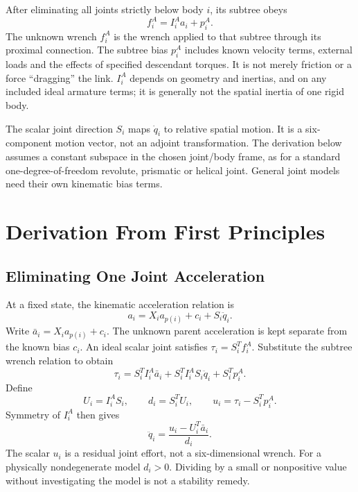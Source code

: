 After eliminating all joints strictly below body $i$, its subtree obeys
\begin{equation}
 f_i^A=I_i^A a_i+p_i^A.
 \label{eq:articulated_inertia}
\end{equation}
The unknown wrench $f_i^A$ is the wrench applied to that subtree through its proximal connection. The subtree bias $p_i^A$ includes known velocity terms, external loads and the effects of specified descendant torques. It is not merely friction or a force ``dragging'' the link. $I_i^A$ depends on geometry and inertias, and on any included ideal armature terms; it is generally not the spatial inertia of one rigid body.

The scalar joint direction $S_i$ maps $\dot q_i$ to relative spatial motion. It is a six-component motion vector, not an adjoint transformation. The derivation below assumes a constant subspace in the chosen joint/body frame, as for a standard one-degree-of-freedom revolute, prismatic or helical joint. General joint models need their own kinematic bias terms.

\section{Derivation From First Principles}
\label{sec:aba_derivation}

\subsection{Eliminating One Joint Acceleration}
\label{subsec:constraint_derivation}

At a fixed state, the kinematic acceleration relation is
\begin{equation}
 a_i=X_i a_{p(i)}+c_i+S_i\ddot q_i.
\end{equation}
Write $\bar a_i=X_i a_{p(i)}+c_i$. The unknown parent acceleration is kept separate from the known bias $c_i$. An ideal scalar joint satisfies $\tau_i=S_i^T f_i^A$. Substitute the subtree wrench relation to obtain
\begin{equation}
 \tau_i=S_i^T I_i^A\bar a_i+S_i^T I_i^A S_i\ddot q_i+S_i^T p_i^A.
\end{equation}
Define
\begin{equation}
 U_i=I_i^A S_i,\qquad d_i=S_i^T U_i,\qquad
 u_i=\tau_i-S_i^T p_i^A.
\end{equation}
Symmetry of $I_i^A$ then gives
\begin{equation}
 \ddot q_i=\frac{u_i-U_i^T\bar a_i}{d_i}.
\end{equation}
The scalar $u_i$ is a residual joint effort, not a six-dimensional wrench. For a physically nondegenerate model $d_i>0$. Dividing by a small or nonpositive value without investigating the model is not a stability remedy.

